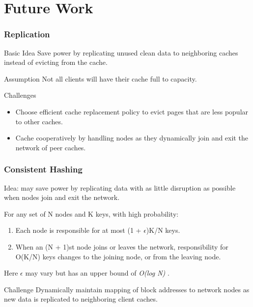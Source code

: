 \documentclass{beamer}
\begin{document}
\section{Future Work}
\begin{frame}
	\frametitle{Replication}
	\begin{block}{Basic Idea}
		Save power by replicating unused clean data to neighboring caches
		instead of evicting from the cache.
	\end{block}
	\begin{block}{Assumption}
		Not all clients will have their cache
		full to capacity.
	\end{block}
	\begin{block}{Challenges}
		\begin{itemize}
			\item Choose efficient cache replacement policy to
				evict pages that are less popular to other caches.
			\item Cache cooperatively by handling nodes as they dynamically
				join and exit the network of peer caches.
		\end{itemize}
	\end{block}
\end{frame}
\begin{frame}
	\frametitle{Consistent Hashing}
	Idea: may save power by replicating data with as little disruption
	as possible when nodes join and exit the network. \\
	\begin{theorem}
		For any set of N nodes and K keys, with high probability:
		\begin{enumerate}
			\item Each node is responsible for at most (1 + $\epsilon$)K/N keys.
			\item When an (N + 1)st node joins or leaves the network,
			responsibility for O(K/N) keys changes to the joining node, or from
			the leaving node.
		\end{enumerate}
	\end{theorem}
	Here $\epsilon$ may vary but has an upper bound of \textit{O(log N)} \cite{key1}.
	\begin{block}
		{Challenge}
		Dynamically maintain mapping of block addresses to network nodes as new
		data is replicated to neighboring client caches.
	\end{block}
\end{frame}
%
%
%
%
%
%
\end{document}
